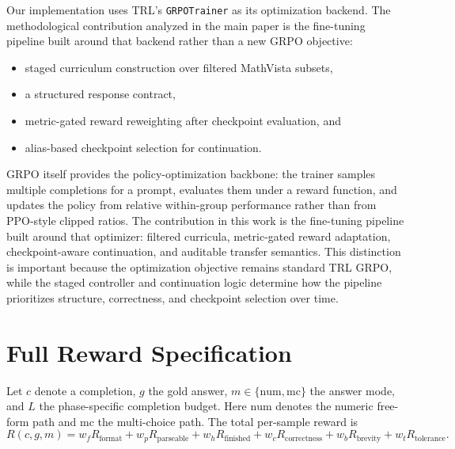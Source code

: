 \documentclass{article} %
\begin{document}
Our implementation uses TRL's \texttt{GRPOTrainer} as its optimization backend. The methodological contribution analyzed in the main paper is the fine-tuning pipeline built around that backend rather than a new GRPO objective:
\begin{itemize}[leftmargin=1.2em]
\item staged curriculum construction over filtered MathVista subsets,
\item a structured response contract,
\item metric-gated reward reweighting after checkpoint evaluation, and
\item alias-based checkpoint selection for continuation.
\end{itemize}
GRPO itself provides the policy-optimization backbone: the trainer samples multiple completions for a prompt, evaluates them under a reward function, and updates the policy from relative within-group performance rather than from PPO-style clipped ratios. The contribution in this work is the fine-tuning pipeline built around that optimizer: filtered curricula, metric-gated reward adaptation, checkpoint-aware continuation, and auditable transfer semantics. This distinction is important because the optimization objective remains standard TRL GRPO, while the staged controller and continuation logic determine how the pipeline prioritizes structure, correctness, and checkpoint selection over time.

\section{Full Reward Specification}

Let $c$ denote a completion, $g$ the gold answer, $m \in \{\mathrm{num}, \mathrm{mc}\}$ the answer mode, and $L$ the phase-specific completion budget. Here $\mathrm{num}$ denotes the numeric free-form path and $\mathrm{mc}$ the multi-choice path. The total per-sample reward is
\begin{equation}
R(c,g,m)=
w_f R_{\mathrm{format}} +
w_p R_{\mathrm{parseable}} +
w_h R_{\mathrm{finished}} +
w_c R_{\mathrm{correctness}} +
w_b R_{\mathrm{brevity}} +
w_t R_{\mathrm{tolerance}}.
\end{equation}
\end{document}
